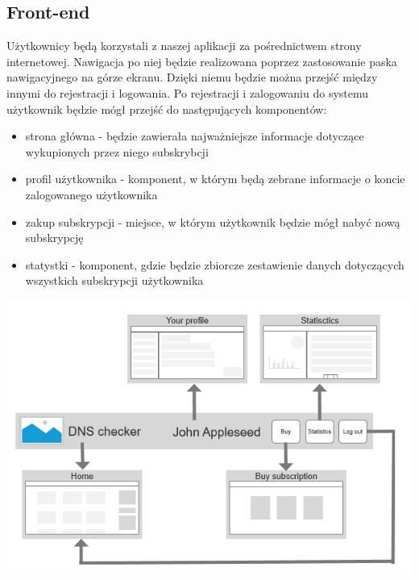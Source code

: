 \subsection{Front-end}

\hspace{0.5cm} Użytkownicy będą korzystali z naszej aplikacji za pośrednictwem strony internetowej. Nawigacja po niej będzie realizowana poprzez zastosowanie paska nawigacyjnego na górze ekranu. Dzięki niemu będzie można przejść między innymi do rejestracji i logowania. Po rejestracji i zalogowaniu do systemu użytkownik będzie mógł przejść do następujących komponentów:
\begin{itemize}

    \item strona główna - będzie zawierała najważniejsze informacje dotyczące wykupionych przez niego subskrybcji
    \item profil użytkownika - komponent, w którym będą zebrane informacje o koncie zalogowanego użytkownika
    \item zakup subskrypcji - miejsce, w którym użytkownik będzie mógł nabyć nową subskrypcję
    \item statystki - komponent, gdzie będzie zbiorcze zestawienie danych dotyczących wszystkich subskrypcji użytkownika
\end{itemize}
\begin{center}
    \includegraphics[scale=0.75]{sitemap.png}
\end{center}

